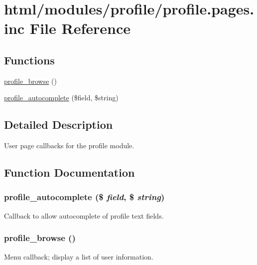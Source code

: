 \hypertarget{profile_8pages_8inc}{
\section{html/modules/profile/profile.pages.inc File Reference}
\label{profile_8pages_8inc}
}
\subsection*{Functions}
\begin{DoxyCompactItemize}
\item 
\hyperlink{profile_8pages_8inc_ab7c0f3726d378d3b5cc75dc58674017d}{profile\_\-browse} ()
\item 
\hyperlink{profile_8pages_8inc_ac7d4fbf97f28716ec2c6c75927da513e}{profile\_\-autocomplete} (\$field, \$string)
\end{DoxyCompactItemize}


\subsection{Detailed Description}
User page callbacks for the profile module. 

\subsection{Function Documentation}
\hypertarget{profile_8pages_8inc_ac7d4fbf97f28716ec2c6c75927da513e}{
\subsubsection[{profile\_\-autocomplete}]{\setlength{\rightskip}{0pt plus 5cm}profile\_\-autocomplete (\$ {\em field}, \/  \$ {\em string})}}
\label{profile_8pages_8inc_ac7d4fbf97f28716ec2c6c75927da513e}
Callback to allow autocomplete of profile text fields. \hypertarget{profile_8pages_8inc_ab7c0f3726d378d3b5cc75dc58674017d}{
\subsubsection[{profile\_\-browse}]{\setlength{\rightskip}{0pt plus 5cm}profile\_\-browse ()}}
\label{profile_8pages_8inc_ab7c0f3726d378d3b5cc75dc58674017d}
Menu callback; display a list of user information. 